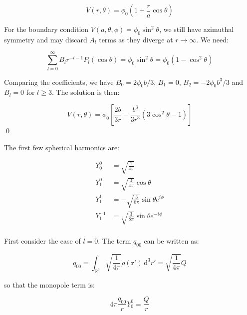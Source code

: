 \documentclass[12pt]{article}
\begin{document}
\begin{equation}
    V(r, \theta) = \phi_{0} \left( 1 + \frac{r}{a} \cos{\theta} \right)
\end{equation}

For the boundary condition $V(a, \theta, \phi) = \phi_{0} \sin^{2}{\theta}$, we still have azimuthal symmetry and may discard $A_{l}$ terms as they diverge at $r \to \infty$. We need:

\begin{equation}
    \sum_{l = 0}^{\infty} B_{l} r^{-l-1}  P_{l}(\cos{\theta}) = \phi_{0} \sin^{2}{\theta} = \phi_{0} (1 - \cos^{2}{\theta})
\end{equation}

Comparing the coefficients, we have $B_{0} = 2\phi_{0}b/3$, $B_{1} = 0$, $B_{2} = -2\phi_{0}b^{3}/3$ and $B_{l} = 0$ for $l \geq 3$. The solution is then:

\begin{equation}
    V(r, \theta) = \phi_{0} \left[ \frac{2b}{3r} - \frac{b^{3}}{3r^{3}} (3\cos^{2}{\theta} - 1) \right]
\end{equation}
\qed



The first few spherical harmonics are:

\begin{equation}
    \begin{split}
        Y_{0}^{0} &= \sqrt{\frac{1}{4\pi}} \\
        Y_{1}^{0} &= \sqrt{\frac{3}{4\pi}} \cos{\theta} \\
        Y_{1}^{1} &= -\sqrt{\frac{3}{8\pi}} \sin{\theta} e^{i\phi} \\
        Y_{1}^{-1} &= \sqrt{\frac{3}{8\pi}} \sin{\theta} e^{-i\phi} \\
    \end{split}
\end{equation}

First consider the case of $l = 0$. The term $q_{00}$ can be written as:

\begin{equation}
    q_{00} = \int_{\mathbb{R}^{3}} \sqrt{\frac{1}{4\pi}} \rho(\mathbf{r}') \, \mathrm{d}^{3}r' = \sqrt{\frac{1}{4\pi}} Q
\end{equation}

so that the monopole term is:

\begin{equation}
    4\pi \frac{q_{00}}{r} Y_{0}^{0} = \frac{Q}{r}
\end{equation}
\end{document}
